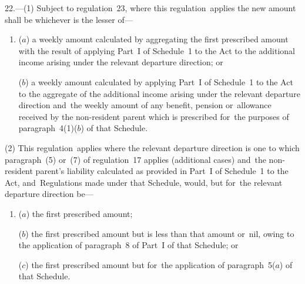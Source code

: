 \documentclass[12pt,a4paper]{article}
\begin{document}
22.---(1)  Subject to regulation~23, where this regulation~applies 
the new amount  %
shall be whichever is the lesser of—
\begin{enumerate}\item[]
%

($a$) a weekly amount calculated by aggregating the first prescribed amount with the result of applying Part~I of Schedule~1 to the Act to the additional income arising under the relevant departure direction; or

($b$) a weekly amount calculated by applying Part~I of Schedule~1 to the Act to the aggregate of the additional income arising under the relevant departure direction and~the weekly amount of any benefit, pension or~allowance received by the non-resident parent which is prescribed for~the purposes of paragraph~4(1)($b$)  of that Schedule.
\end{enumerate}

(2) This regulation~applies where the relevant departure direction is one to which paragraph~(5) or~(7) of regulation~17 applies (additional cases) and~the non-resident parent’s liability calculated as provided in Part~I of Schedule~1 to the Act, and~Regulations made under that Schedule, would, but for~the relevant departure direction be—
\begin{enumerate}\item[]
($a$) the first prescribed amount;

($b$) the first prescribed amount but is less than that amount or~nil, owing to the application of paragraph~8 of Part~I of that Schedule; or

($c$) the first prescribed amount but for~the application of paragraph~5($a$)  of that Schedule.
\end{enumerate}
\end{document}
